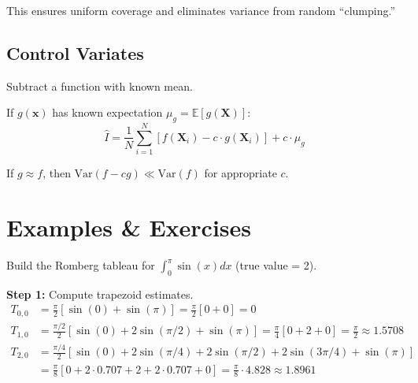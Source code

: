 This ensures uniform coverage and eliminates variance from random ``clumping.''


\subsection{Control Variates}

 Subtract a function with known mean.

If $g(\mathbf{x})$ has known expectation $\mu_g = \mathbb{E}[g(\mathbf{X})]$:
\begin{equation}
    \hat{I} = \frac{1}{N}\sum_{i=1}^N [f(\mathbf{X}_i) - c \cdot g(\mathbf{X}_i)] + c \cdot \mu_g
\end{equation}

If $g \approx f$, then $\text{Var}(f - cg) \ll \text{Var}(f)$ for appropriate $c$.






\newpage
\section{Examples \& Exercises}


 Build the Romberg tableau for $\int_0^{\pi} \sin(x) dx$ (true value = 2).

\textbf{Step 1:} Compute trapezoid estimates.
\begin{align*}
    T_{0,0} &= \frac{\pi}{2}[\sin(0) + \sin(\pi)] = \frac{\pi}{2}[0 + 0] = 0 \\
    T_{1,0} &= \frac{\pi/2}{2}[\sin(0) + 2\sin(\pi/2) + \sin(\pi)] = \frac{\pi}{4}[0 + 2 + 0] = \frac{\pi}{2} \approx 1.5708 \\
    T_{2,0} &= \frac{\pi/4}{2}[\sin(0) + 2\sin(\pi/4) + 2\sin(\pi/2) + 2\sin(3\pi/4) + \sin(\pi)] \\
    &= \frac{\pi}{8}[0 + 2 \cdot 0.707 + 2 + 2 \cdot 0.707 + 0] = \frac{\pi}{8} \cdot 4.828 \approx 1.8961
\end{align*}

